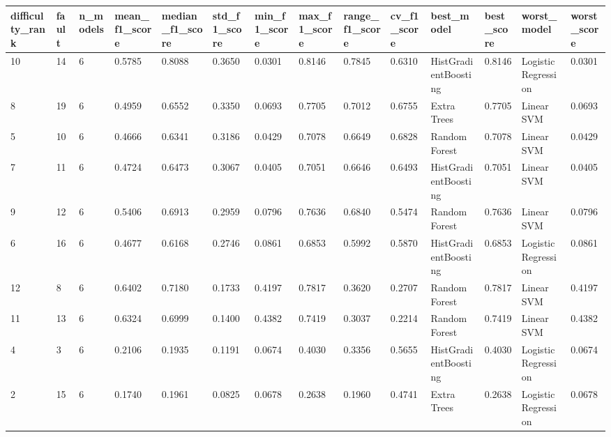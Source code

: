 \begin{tabular}{llllllllllllll}
\toprule
difficulty\_rank & fault & n\_models & mean\_f1\_score & median\_f1\_score & std\_f1\_score & min\_f1\_score & max\_f1\_score & range\_f1\_score & cv\_f1\_score & best\_model & best\_score & worst\_model & worst\_score \\
\midrule
10 & 14 & 6 & 0.5785 & 0.8088 & 0.3650 & 0.0301 & 0.8146 & 0.7845 & 0.6310 & HistGradientBoosting & 0.8146 & Logistic Regression & 0.0301 \\
8 & 19 & 6 & 0.4959 & 0.6552 & 0.3350 & 0.0693 & 0.7705 & 0.7012 & 0.6755 & Extra Trees & 0.7705 & Linear SVM & 0.0693 \\
5 & 10 & 6 & 0.4666 & 0.6341 & 0.3186 & 0.0429 & 0.7078 & 0.6649 & 0.6828 & Random Forest & 0.7078 & Linear SVM & 0.0429 \\
7 & 11 & 6 & 0.4724 & 0.6473 & 0.3067 & 0.0405 & 0.7051 & 0.6646 & 0.6493 & HistGradientBoosting & 0.7051 & Linear SVM & 0.0405 \\
9 & 12 & 6 & 0.5406 & 0.6913 & 0.2959 & 0.0796 & 0.7636 & 0.6840 & 0.5474 & Random Forest & 0.7636 & Linear SVM & 0.0796 \\
6 & 16 & 6 & 0.4677 & 0.6168 & 0.2746 & 0.0861 & 0.6853 & 0.5992 & 0.5870 & HistGradientBoosting & 0.6853 & Logistic Regression & 0.0861 \\
12 & 8 & 6 & 0.6402 & 0.7180 & 0.1733 & 0.4197 & 0.7817 & 0.3620 & 0.2707 & Random Forest & 0.7817 & Linear SVM & 0.4197 \\
11 & 13 & 6 & 0.6324 & 0.6999 & 0.1400 & 0.4382 & 0.7419 & 0.3037 & 0.2214 & Random Forest & 0.7419 & Linear SVM & 0.4382 \\
4 & 3 & 6 & 0.2106 & 0.1935 & 0.1191 & 0.0674 & 0.4030 & 0.3356 & 0.5655 & HistGradientBoosting & 0.4030 & Logistic Regression & 0.0674 \\
2 & 15 & 6 & 0.1740 & 0.1961 & 0.0825 & 0.0678 & 0.2638 & 0.1960 & 0.4741 & Extra Trees & 0.2638 & Logistic Regression & 0.0678 \\
\bottomrule
\end{tabular}
